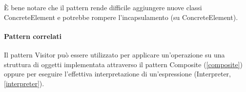 È bene notare che il pattern rende difficile aggiungere nuove classi ConcreteElement e potrebbe rompere l'incapsulamento (su ConcreteElement).

\paragraph{Pattern correlati} Il pattern Visitor può essere utilizzato per applicare un'operazione su una struttura di oggetti implementata attraverso il pattern Composite (\ref{composite}) oppure per eseguire l'effettiva interpretazione di un'espressione (Interpreter, \ref{interpreter}).


\newpage